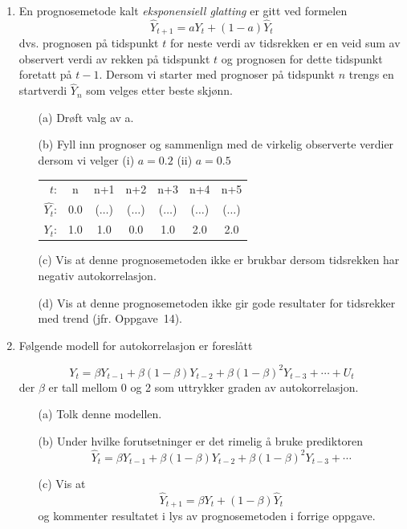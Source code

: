 \begin{enumerate}
\item En prognosemetode kalt {\em eksponensiell glatting} er gitt ved
 formelen
\[ {\hat{Y}}_{t+1}= aY_t+(1-a){\hat{Y}}_t \] 
\noindent dvs. prognosen på tidspunkt $t$ for neste verdi av tidsrekken er
 en veid sum av observert verdi av rekken på tidspunkt $t$ og prognosen
 for dette tidspunkt foretatt på $t - 1$.  Dersom vi starter med prognoser
 på tidspunkt $n$ trengs en startverdi $\hat{Y}_n$ som velges etter beste 
 skjønn.  

\begin{itemize}
\item[(a)] Drøft valg av a.
\item[(b)] Fyll inn prognoser og sammenlign med de virkelig observerte
verdier dersom vi velger (i) $a = 0.2$  (ii) $a = 0.5$ \\
\begin{tabular}{rcccccc}
 $t$:         & n   &   n+1   &   n+2   &   n+3   &   n+4   &   n+5 \\
 $\hat{Y_t}$:&0.0&($\ldots $)&($\ldots $)&($\ldots $)&($\ldots $)&($\ldots $)\\
 $Y_t$:       & 1.0 &   1.0   &   0.0   &   1.0   &   2.0   &   2.0
\end{tabular}
\item[(c)] Vis at denne prognosemetoden ikke er brukbar dersom tidsrekken
har negativ autokorrelasjon.
\item[(d)] Vis at denne prognosemetoden ikke gir gode resultater for 
tidsrekker med trend (jfr. Oppgave~14).
\end{itemize}

\item Følgende modell for autokorrelasjon er foreslått

\[   Y_t=\beta Y_{t-1}+\beta (1-\beta)Y_{t-2}+\beta {(1-\beta)}^2 Y_{t-3}
                         + \cdots + U_t \]
\noindent der $\beta$ er tall mellom 0 og 2 som uttrykker graden av
          autokorrelasjon.
\begin{itemize}
\item[(a)] Tolk denne modellen.
\item[(b)] Under hvilke forutsetninger er det rimelig å bruke 
prediktoren
\[  {\hat{Y}}_t=\beta Y_{t-1}+\beta (1-\beta)Y_{t-2}
                    +\beta {(1-\beta)}^2 Y_{t-3}+ \cdots   \]
\item[(c)] Vis at
\[   {\hat{Y}}_{t+1} = \beta Y_t + (1 - \beta){\hat{Y}}_t \]
\noindent og kommenter resultatet i lys av prognosemetoden i forrige oppgave.
\end{itemize}


\end{enumerate}
